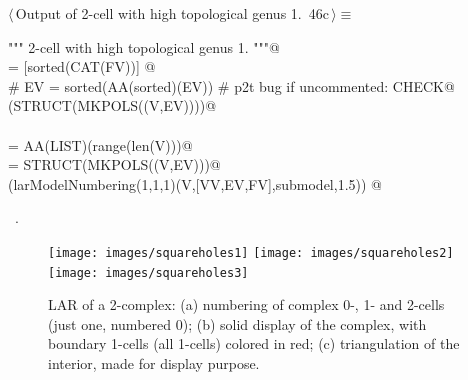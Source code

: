 \documentclass[11pt,oneside]{article}    %
\begin{document}
\begin{flushleft} \small \label{scrap76}
\protect{}$\langle\,$Output of 2-cell with high topological genus 1.\nobreak\ {\footnotesize 46c}$\,\rangle\equiv$
\vspace{-1ex}
\begin{list}{}{} \item
\mbox{}\verb@""" 2-cell with high topological genus 1. """@\\
\mbox{}\verb@FV = [sorted(CAT(FV))] @\\
\mbox{}\verb@# EV = sorted(AA(sorted)(EV))  # p2t bug if uncommented: CHECK@\\
\mbox{}\verb@VIEW(STRUCT(MKPOLS((V,EV))))@\\
\mbox{}\verb@@\\
\mbox{}\verb@VV = AA(LIST)(range(len(V)))@\\
\mbox{}\verb@submodel = STRUCT(MKPOLS((V,EV)))@\\
\mbox{}\verb@VIEW(larModelNumbering(1,1,1)(V,[VV,EV,FV],submodel,1.5)) @\\
\mbox{}\verb@@{\NWsep}
\end{list}
\vspace{-1ex}
\footnotesize\addtolength{\baselineskip}{-1ex}
\begin{list}{}{\setlength{\itemsep}{-\parsep}\setlength{\itemindent}{-\leftmargin}}
\item \NWtxtMacroRefIn\ .
\end{list}
\end{flushleft}


\begin{figure}[htbp] %
   \centering
   \texttt{[image: images/squareholes1]} 
   \texttt{[image: images/squareholes2]} 
   \texttt{[image: images/squareholes3]} 
   \caption{LAR of a 2-complex: (a) numbering of complex 0-, 1- and 2-cells (just one, numbered 0); (b) solid display of the complex, with boundary 1-cells (all 1-cells) colored in red; (c) triangulation of the interior, made for display purpose.}
   \label{fig:squareholes}
\end{figure}
\end{document}
